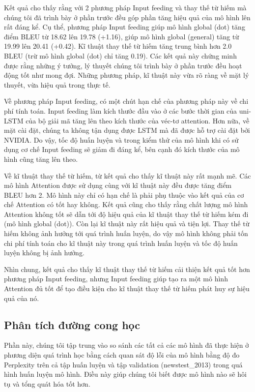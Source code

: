 Kết quả cho thấy rằng với 2 phương pháp Input feeding và thay thế từ hiếm mà chúng tôi đã trình bày ở phần trước đều góp phần tăng hiệu quả của mô hình lên rất đáng kể. Cụ thể, phương pháp Input feeding giúp mô hình global (dot) tăng điểm BLEU từ 18.62 lên 19.78 (+1.16), giúp mô hình global (general) tăng từ 19.99 lên 20.41 (+0.42). Kĩ thuật thay thế từ hiếm tăng trung bình hơn 2.0 BLEU (trừ mô hình global (dot) chỉ tăng 0.19). Các kết quả này chứng minh được rằng những ý tưởng, lý thuyết chúng tôi trình bày ở phần trước đều hoạt động tốt như mong đợi. Những phương pháp, kĩ thuật này vừa rõ ràng về mặt lý thuyết, vừa hiệu quả trong thực tế.

Về phương pháp Input feeding, có một chút hạn chế của phương pháp này về chi phí tính toán. Input feeding làm kích thước đầu vào ở các bước thời gian của uni-LSTM của bộ giải mã tăng lên theo kích thước của véc-tơ attention. Hơn nữa, về mặt cài đặt, chúng ta không tận dụng được LSTM mà đã được hỗ trợ cài đặt bởi NVIDIA. Do vậy, tốc độ huấn luyện và trong kiểm thử của mô hình khi có sử dụng cơ chế Input feeding sẽ giảm đi đáng kể, bên cạnh đó kích thước của mô hình cũng tăng lên theo.

Về kĩ thuật thay thế từ hiếm, từ kết quả cho thấy kĩ thuật này rất mạnh mẽ. Các mô hình Attention được sử dụng cùng với kĩ thuật này đều được tăng điểm BLEU hơn 2. Mô hình này chỉ có hạn chế là phải phụ thuộc vào kết quả của cơ chế Attention có tốt hay không. Kết quả cũng cho thấy rằng chất lượng mô hình Attention không tốt sẽ dẫn tới độ hiệu quả của kĩ thuật thay thế từ hiếm kém đi (mô hình global (dot)). Còn lại kĩ thuật này rất hiệu quả và tiện lợi. Thay thế từ hiếm không ảnh hưởng tới quá trình huấn luyện, do vậy mô hình không phải tốn chi phí tính toán cho kĩ thuật này trong quá trình huấn luyện và tốc độ huấn luyện không bị ảnh hưởng. 

Nhìn chung, kết quả cho thấy kĩ thuật thay thế từ hiếm cải thiện kết quả tốt hơn phương pháp Input feeding, nhưng Input feeding giúp tạo ra một mô hình Attention đủ tốt để tạo điều kiện cho kĩ thuật thay thế từ hiếm phát huy sự hiệu quả của nó.

\subsection{Phân tích đường cong học}
Phần này, chúng tôi tập trung vào so sánh các tất cả các mô hình đã thực hiện ở phương diện quá trình học bằng cách quan sát độ lỗi của mô hình bằng độ đo Perplexity trên cả tập huấn luyện và tập validation (newstest\_2013) trong quá hình huấn luyện mô hình. Điều này giúp chúng tôi biết được mô hình nào sẽ hôi tụ và tổng quát hóa tốt hơn.

